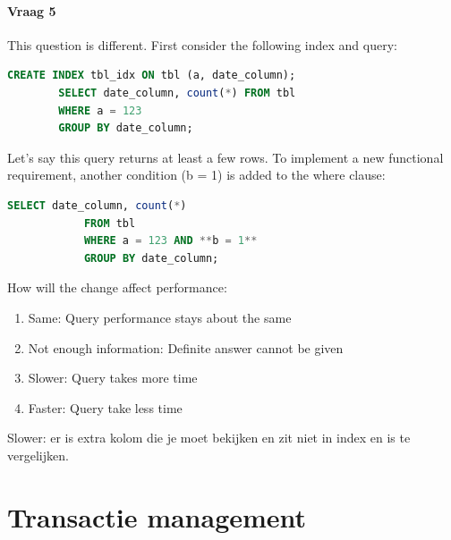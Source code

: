 \documentclass{report}
\begin{document}
    \subsubsection{Vraag 5}
        This question is different.
        First consider the following index and query:
        \begin{lstlisting}[language=SQL]
        CREATE INDEX tbl_idx ON tbl (a, date_column);
        SELECT date_column, count(*) FROM tbl
        WHERE a = 123
        GROUP BY date_column;
        \end{lstlisting}
        Let's say this query returns at least a few
        rows.
        To implement a new functional
        requirement, another condition (b = 1) is
        added to the where clause:
        \begin{lstlisting}[language=SQL]
            SELECT date_column, count(*)
            FROM tbl
            WHERE a = 123 AND **b = 1**
            GROUP BY date_column;
        \end{lstlisting}
        How will the change affect performance:
        \begin{enumerate}
            \item Same: Query performance stays about the same 
            \item Not enough information: Definite answer cannot be given
            \item Slower: Query takes more time
            \item Faster: Query take less time
        \end{enumerate}
        Slower: er is extra kolom die je moet bekijken en zit niet in index en is te vergelijken.
        
{\let\clearpage\relax \chapter{Transactie management}}
\end{document}
